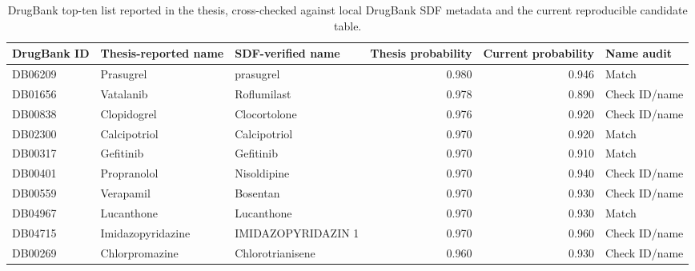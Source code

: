 \begin{table}[H]
\centering
\caption{DrugBank top-ten list reported in the thesis, cross-checked against local DrugBank SDF metadata and the current reproducible candidate table.}
\label{tab:py_drugbank_thesis_top10}
\begin{tabular}{lp{}p{}rrl}
\toprule
DrugBank ID & Thesis-reported name & SDF-verified name & Thesis probability & Current probability & Name audit \\
\midrule
DB06209 & Prasugrel & prasugrel & 0.980 & 0.946 & Match \\
DB01656 & Vatalanib & Roflumilast & 0.978 & 0.890 & Check ID/name \\
DB00838 & Clopidogrel & Clocortolone & 0.976 & 0.920 & Check ID/name \\
DB02300 & Calcipotriol & Calcipotriol & 0.970 & 0.920 & Match \\
DB00317 & Gefitinib & Gefitinib & 0.970 & 0.910 & Match \\
DB00401 & Propranolol & Nisoldipine & 0.970 & 0.940 & Check ID/name \\
DB00559 & Verapamil & Bosentan & 0.970 & 0.930 & Check ID/name \\
DB04967 & Lucanthone & Lucanthone & 0.970 & 0.930 & Match \\
DB04715 & Imidazopyridazine & IMIDAZOPYRIDAZIN 1 & 0.970 & 0.960 & Check ID/name \\
DB00269 & Chlorpromazine & Chlorotrianisene & 0.960 & 0.930 & Check ID/name \\
\bottomrule
\end{tabular}
\end{table}
